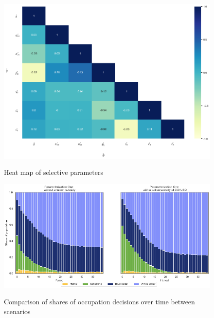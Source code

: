 \vspace{10mm} %
\begin{figure}[H]
	\caption{Heat map of selective parameters \label{fig:2}}
	\centering
	\includegraphics[scale=0.5]{./resources/heatmap}
	\label{fig:corr}
\end{figure}


\vspace{10mm} %
\begin{figure}[H]
	\caption{ Comparison of shares of occupation decisions over time between scenarios\label{fig:3}}
	\centering
	\includegraphics[scale=0.5]{./resources/choiceovertime}
	\label{fig:corr}
\end{figure}


